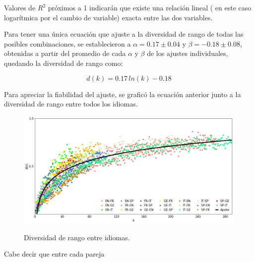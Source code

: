 Valores de $R^{2}$ próximos a 1 indicarán que existe una relación lineal ( en este caso logarítmica por el cambio de variable) exacta entre las dos variables.

Para tener una única ecuación que ajuste a la diversidad de rango de todas las posibles  combinaciones, se establecieron a $\alpha = 0.17\pm 0.04$ y $\beta = -0.18 \pm 0.08$, obtenidas a partir del promedio de cada $\alpha$ y $\beta$ de los ajustes individuales, quedando la diversidad de rango como:

\begin{equation}
	\label{ec.gen_ajs}
	d(k) = 0.17\,ln(k) - 0.18
\end{equation} 

Para apreciar la fiabilidad del ajuste, se graficó la ecuación anterior junto a la diversidad de rango entre todos los idiomas.

\clearpage

\begin{figure}[h!]
	\centering
	\includegraphics[scale=.39]{Cap_6/DR_gen.png}
	\label{fig.DR_gen}
	\caption{Diversidad de rango entre idiomas.}
\end{figure}
 

Cabe decir que entre cada pareja 


 
\newpage



